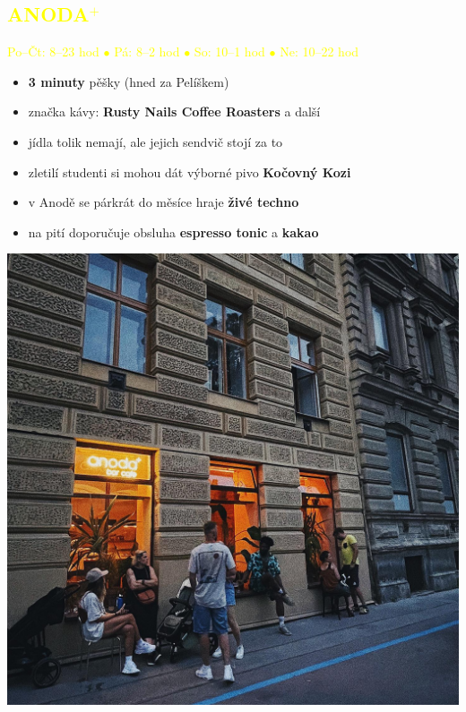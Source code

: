 \documentclass[a5paper, twoside]{article}
\newcommand{\podnadpis}[2]{
  \subsection*{\textcolor{#2}{#1}}
}
\begin{document}
\noindent\begin{minipage}{0.7\textwidth}
	\podnadpis{ANODA$^+$}{yellow}
	\textcolor{yellow}{Po--Čt: 8--23 hod $\bullet$ Pá: 8--2 hod $\bullet$ So: 10--1 hod $\bullet$ Ne: 10--22 hod}
	\vspace{5pt}
	\small
	\begin{itemize}[leftmargin=10pt]
		\item \textbf{3 minuty} pěšky (hned za Pelíškem)
		\item značka kávy: \textbf{Rusty Nails Coffee Roasters} a další
		\item jídla tolik nemají, ale jejich sendvič stojí za to
		\item zletilí studenti si mohou dát výborné pivo \textbf{Kočovný Kozi}
		\item v Anodě se párkrát do měsíce hraje \textbf{živé techno}
		\item na pití doporučuje obsluha \textbf{espresso tonic} a \textbf{kakao}
	\end{itemize}
\end{minipage}
\hfill
\begin{minipage}{0.27\textwidth}
	\includegraphics[width=\linewidth]{anoda.jpg}
\end{minipage}

\vfill
\end{document}
